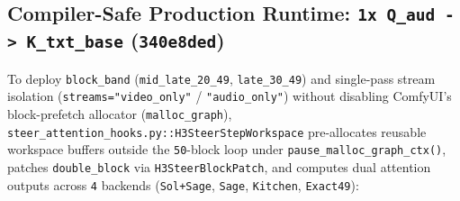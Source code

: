 \documentclass[10pt]{article}
\begin{document}
\subsection{Compiler-Safe Production Runtime: \texttt{1x Q\_aud -> K\_txt\_base} (\texttt{340e8ded})}

To deploy \texttt{block\_band} (\texttt{mid\_late\_20\_49}, \texttt{late\_30\_49}) and single-pass stream isolation (\texttt{streams="video\_only"} / \texttt{"audio\_only"}) without disabling ComfyUI's block-prefetch allocator (\texttt{malloc\_graph}), \texttt{steer\_attention\_hooks.py::H3SteerStepWorkspace} pre-allocates reusable workspace buffers outside the \texttt{50}-block loop under \texttt{pause\_malloc\_graph\_ctx()}, patches \texttt{double\_block} via \texttt{H3SteerBlockPatch}, and computes dual attention outputs across \texttt{4} backends (\texttt{Sol+Sage}, \texttt{Sage}, \texttt{Kitchen}, \texttt{Exact49}):
\end{document}
